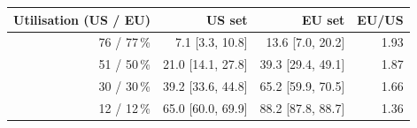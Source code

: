 \begin{tabular}{rrrr}
\toprule
Utilisation (US / EU) & US set & EU set & EU/US \\
\midrule
76 / 77\,\% & 7.1 [3.3, 10.8] & 13.6 [7.0, 20.2] & 1.93 \\
51 / 50\,\% & 21.0 [14.1, 27.8] & 39.3 [29.4, 49.1] & 1.87 \\
30 / 30\,\% & 39.2 [33.6, 44.8] & 65.2 [59.9, 70.5] & 1.66 \\
12 / 12\,\% & 65.0 [60.0, 69.9] & 88.2 [87.8, 88.7] & 1.36 \\
\bottomrule
\end{tabular}
